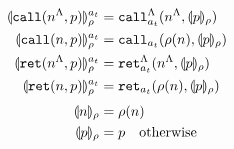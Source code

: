 \documentclass[preprint,onecolumn,9pt]{sigplanconf} %
\begin{document}
\begin{align*}
  \llparenthesis {\tt call}(n^\Lambda, p) \rrparenthesis_{\rho}^{a_t} &=
    {\tt call}_{a_t}^{\Lambda}(n^\Lambda,\llparenthesis p \rrparenthesis_{\rho})
\\
  \llparenthesis {\tt call}(n, p) \rrparenthesis_{\rho}^{a_t} &=
    {\tt call}_{a_t}(\rho(n),\llparenthesis p \rrparenthesis_{\rho})
\\
  \llparenthesis {\tt ret}(n^\Lambda, p) \rrparenthesis_{\rho}^{a_t} &=
    {\tt ret}_{a_t}^{\Lambda}(n^\Lambda,\llparenthesis p \rrparenthesis_{\rho})
\\
  \llparenthesis {\tt ret}(n, p) \rrparenthesis_{\rho}^{a_t} &=
    {\tt ret}_{a_t}(\rho(n),\llparenthesis p \rrparenthesis_{\rho})
\\[2pt]
  \llparenthesis n \rrparenthesis_{\rho} &= \rho(n)
\\
  \llparenthesis p \rrparenthesis_{\rho} &= p \quad\text{otherwise}
\end{align*}
\end{document}
